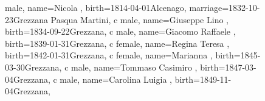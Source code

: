 \documentclass{article}
\begin{document}
\begin{figure}
\begin{genealogypicture}
{{{{{                        male,
                        name={Nicola },
                        birth={1814-04-01}{Alcenago},
                        marriage={1832-10-23}{Grezzana \newline Pasqua Martini},
                    }
                    c{
                        male,
                        name={Giuseppe Lino },
                        birth={1834-09-22}{Grezzana},
                    }
                    c{
                        male,
                        name={Giacomo Raffaele },
                        birth={1839-01-31}{Grezzana},
                    }
                    c{
                        female,
                        name={Regina Teresa },
                        birth={1842-01-31}{Grezzana},
                    }
                    c{
                        female,
                        name={Marianna },
                        birth={1845-03-30}{Grezzana},
                    }
                    c{
                        male,
                        name={Tommaso Casimiro },
                        birth={1847-03-04}{Grezzana},
                    }
                    c{
                        male,
                        name={Carolina Luigia },
                        birth={1849-11-04}{Grezzana},
                    }
                }
            }
        }
    }
    \end{genealogypicture}

\label{fig:figure2}
\end{figure}
\end{document}
